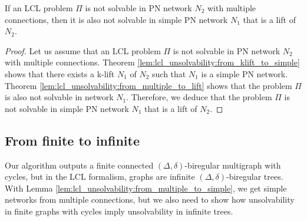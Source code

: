 

%
\begin{lemma} \label{lem:lcl_unsolvability:from_multiple_to_simple}
    If an LCL problem $\Pi$ is not solvable in PN network $N_2$ with multiple connections, then it is also not solvable in simple PN network $N_1$ that is a lift of $N_2$.
\end{lemma}
\begin{proof}
    Let us assume that an LCL problem $\Pi$ is not solvable in PN network $N_2$ with multiple connections.
    Theorem \ref{lem:lcl_unsolvability:from_klift_to_simple} shows that there exists a k-lift $N_1$ of $N_2$ such that $N_1$ is a simple PN network.
    Theorem \ref{lem:lcl_unsolvability:from_multiple_to_lift} shows that the problem $\Pi$ is also not solvable in network $N_1$.
    Therefore, we deduce that the problem $\Pi$ is not solvable in simple PN network $N_1$ that is a lift of $N_2$.
\end{proof}

\subsection{From finite to infinite} \label{sec:algorithm:from_finite_to_infinite}
Our algorithm outputs a finite connected $(\Delta, \delta)$-biregular multigraph with cycles, but in the LCL formalism, graphs are infinite $(\Delta, \delta)$-biregular trees.
With Lemma \ref{lem:lcl_unsolvability:from_multiple_to_simple}, we get simple networks from multiple connections, but we also need to show how unsolvability in finite graphs with cycles imply unsolvability in infinite trees.

